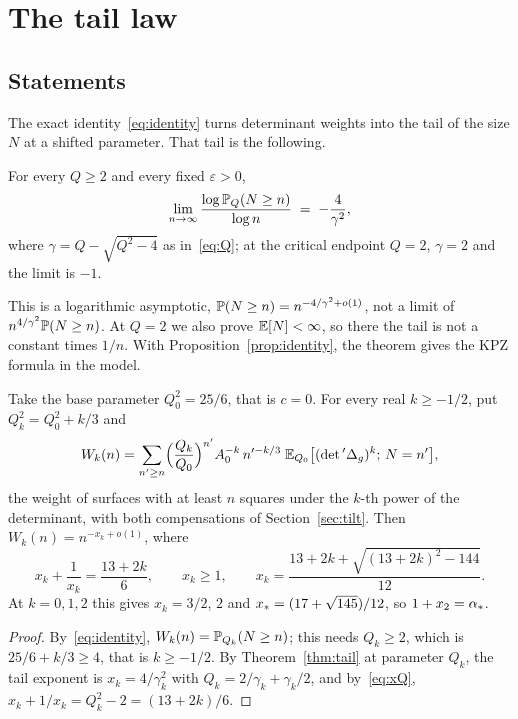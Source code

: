 \section{The tail law}\label{sec:tail}

\subsection{Statements}

The exact identity~\eqref{eq:identity} turns determinant weights into the tail of the size $N$ at a
shifted parameter. That tail is the following.

\begin{theorem}\label{thm:tail}
For every $Q\ge2$ and every fixed $\varepsilon>0$,
\[
\lim_{n\to\infty}\frac{\log\mathbb{P}_Q(N\ge n)}{\log n}\;=\;-\frac4{\gamma^2},
\]
where $\gamma=Q-\sqrt{Q^2-4}$ as in~\eqref{eq:Q}; at the critical endpoint $Q=2$, $\gamma=2$ and
the limit is $-1$.
\end{theorem}

This is a logarithmic asymptotic, $\mathbb{P}(N\ge n)=n^{-4/\gamma^2+o(1)}$, not a limit of
$n^{4/\gamma^2}\mathbb{P}(N\ge n)$. At $Q=2$ we also prove $\mathbb{E}[N]<\infty$, so there the tail is not a
constant times $1/n$. With Proposition~\ref{prop:identity}, the theorem gives the KPZ formula in
the model.

\begin{theorem}\label{thm:kpz}
Take the base parameter $Q_0^2=25/6$, that is $c=0$. For every real $k\ge-1/2$, put
$Q_k^2=Q_0^2+k/3$ and
\[
W_k(n)=\sum_{n'\ge n}\Bigl(\frac{Q_k}{Q_0}\Bigr)^{n'}A_0^{-k}\,n'^{-k/3}\;
\mathbb{E}_{Q_0}\bigl[(\det{}'\Delta_g)^k;\,N=n'\bigr],
\]
the weight of surfaces with at least $n$ squares under the $k$-th power of the determinant, with
both compensations of Section~\ref{sec:tilt}. Then $W_k(n)=n^{-x_k+o(1)}$, where
\[
x_k+\frac1{x_k}=\frac{13+2k}{6},\qquad x_k\ge1,\qquad
x_k=\frac{13+2k+\sqrt{(13+2k)^2-144}}{12}.
\]
At $k=0,1,2$ this gives $x_k=3/2$, $2$ and $x_*=(17+\sqrt{145})/12$, so $1+x_2=\alpha_*$.
\end{theorem}

\begin{proof}
By~\eqref{eq:identity}, $W_k(n)=\mathbb{P}_{Q_k}(N\ge n)$; this needs $Q_k\ge2$, which is
$25/6+k/3\ge4$, that is $k\ge-1/2$. By Theorem~\ref{thm:tail} at parameter $Q_k$, the tail
exponent is $x_k=4/\gamma_k^2$ with $Q_k=2/\gamma_k+\gamma_k/2$, and by~\eqref{eq:xQ},
$x_k+1/x_k=Q_k^2-2=(13+2k)/6$.
\end{proof}

